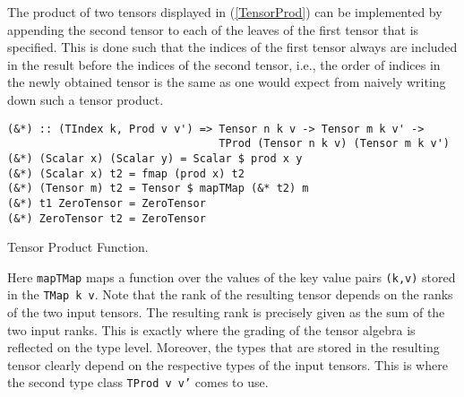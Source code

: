 The product of two tensors displayed in (\ref{TensorProd}) can be implemented by appending the second tensor to each of the leaves of the first tensor that is specified. This is done such that the indices of the first tensor always are included in the result before the indices of the second tensor, i.e., the order of indices in the newly obtained tensor is the same as one would expect from naively writing down such a tensor product.
\begin{listing}[hbt!]
\begin{verbatim}
(&*) :: (TIndex k, Prod v v') => Tensor n k v -> Tensor m k v' ->
                                 TProd (Tensor n k v) (Tensor m k v')
(&*) (Scalar x) (Scalar y) = Scalar $ prod x y
(&*) (Scalar x) t2 = fmap (prod x) t2
(&*) (Tensor m) t2 = Tensor $ mapTMap (&* t2) m
(&*) t1 ZeroTensor = ZeroTensor
(&*) ZeroTensor t2 = ZeroTensor
\end{verbatim}
\caption{Tensor Product Function.}\label{TensorProd}
\end{listing}
Here \texttt{mapTMap} maps a function over the values of the key value pairs \texttt{(k,v)} stored in the \texttt{TMap k v}.
Note that the rank of the resulting tensor depends on the ranks of the two input tensors. The resulting rank is precisely given as the sum of the two input ranks. This is exactly where the grading of the tensor algebra is reflected on the type level. Moreover, the types that are stored in the resulting tensor clearly depend on the respective types of the input tensors. This is where the second type class \texttt{TProd v v'} comes to use. 


